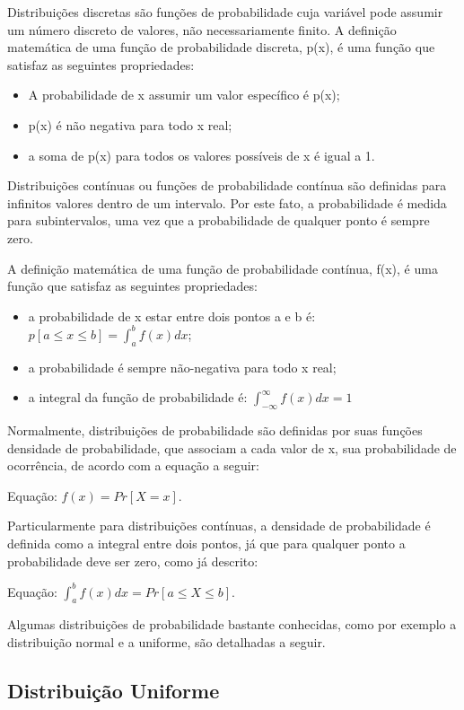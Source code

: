 Distribuições discretas são funções de probabilidade cuja variável pode assumir um número discreto de valores, não necessariamente finito. A definição matemática de uma função de probabilidade discreta, p(x), é uma função que satisfaz as seguintes propriedades:

\begin{itemize}
	\item A probabilidade de x assumir um valor específico é p(x);
	\item p(x) é não negativa para todo x real;
	\item a soma de p(x) para todos os valores possíveis de x é igual a 1.
\end{itemize}

Distribuições contínuas ou funções de probabilidade contínua são definidas para infinitos valores dentro de um intervalo. Por este fato, a probabilidade é medida para subintervalos, uma vez que a probabilidade de qualquer ponto é sempre zero\cite{distteoria}.

A definição matemática de uma função de probabilidade contínua, f(x), é uma função que satisfaz as seguintes propriedades:

\begin{itemize}
	\item a probabilidade de x estar entre dois pontos a e b é: \(p[a \leqslant x \leqslant b] = \int_{a}^{b}f(x)dx\);
	\item a probabilidade é sempre não-negativa para todo x real;
	\item a integral da função de probabilidade é: \(\int_{-\infty}^{\infty}f(x)dx = 1\)
\end{itemize}

Normalmente, distribuições de probabilidade são definidas por suas funções densidade de probabilidade, que associam a cada valor de x, sua probabilidade de ocorrência, de acordo com a equação a seguir: 

Equação: \(f(x) = Pr[X = x]\).

Particularmente para distribuições contínuas, a densidade de probabilidade é definida como a integral entre dois pontos, já que para qualquer ponto a probabilidade deve ser zero, como já descrito:

Equação: \(\int_{a}^{b}f(x)dx = Pr[a \leqslant X \leqslant b]\).

Algumas distribuições de probabilidade bastante conhecidas, como por exemplo a distribuição normal e a uniforme, são detalhadas a seguir.

\subsection{Distribuição Uniforme}

